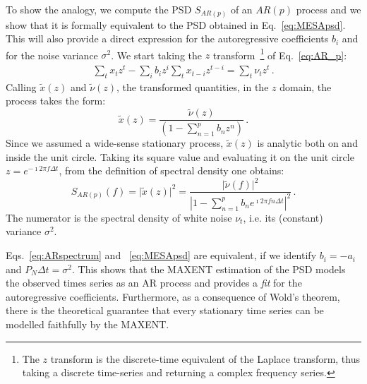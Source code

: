 \documentclass{aa}
\begin{document}
To show the analogy, we compute the PSD $S_{AR(p)}$ of an $AR(p)$ process and we show that it is formally equivalent to the PSD obtained in Eq.~\eqref{eq:MESApsd}. This will also provide a direct expression for the autoregressive coefficients $b_i$ and for the noise variance $\sigma^2$.
We start taking the $z$ transform~\footnote{The $z$ transform is the discrete-time equivalent of the Laplace transform, thus taking a discrete time-series and returning a complex frequency series.} of Eq.~\eqref{eq:AR_p}: 
\begin{align}
    \sum_t x_t z^t - \sum_i b_i z^i\sum_t x_{t - i} z^{t - i} = \sum_t \nu_t z^t\,.
\end{align}
Calling $\tilde x(z)$ and $\tilde \nu (z)$, the transformed quantities, 
in the $z$ domain, the process takes the form:
\begin{equation}
    \tilde x(z) = \frac{\tilde\nu(z)}{\left(1 - \sum_{n = 1}^p b_n z^n \right)}\,.
\end{equation}
Since we assumed a wide-sense stationary process, $\tilde{x}(z)$ is analytic both on and inside the unit circle. Taking its square value and evaluating it on the unit circle $z = e^{-\imath 2 \pi f \Delta t}$, from the definition of spectral density one obtains:
\begin{equation}\label{eq:ARspectrum}
    S_{AR(p)}(f) = \vert \tilde x(z)\vert ^ 2 = 
    \frac{\vert \tilde \nu(f) \vert ^ 2}{\left\vert 1 - \sum_{n = 1}^p b_n e^{\imath 2 \pi f n \Delta t} \right\vert ^ 2}\,.
\end{equation}
The numerator is the spectral density of white noise $\nu_t$, i.e. its (constant) variance $\sigma^2$.

Eqs.~\eqref{eq:ARspectrum} and ~\eqref{eq:MESApsd} are equivalent, if we identify $b_i = - a_i$ and $P_N \Delta t= \sigma ^ 2$.
This shows that the MAXENT estimation of the PSD models the observed times series as an AR process and provides a {\it fit} for the autoregressive coefficients.
Furthermore, as a consequence of Wold's theorem, there is the theoretical guarantee that every stationary time series can be modelled faithfully by the MAXENT.
\end{document}
